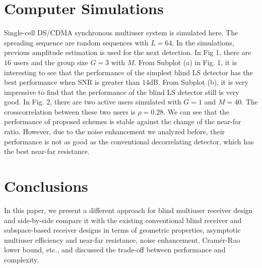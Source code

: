 \documentclass[a4paper,10pt,fleqn, twocolumn]{IEEETran}
\begin{document}
\section{Computer Simulations}
\begin{figure} \label{BER}
\end{figure}
Single-cell DS/CDMA synchronous multiuser system is simulated
here. The spreading sequence are random sequences with $L=64$. In
the simulations, previous amplitude estimation is used for the
next detection. In Fig 1, there are $16$ users and the group size
$G=3$ with $M$. From Subplot (a) in Fig. 1, it is interesting to
see that the performance of the simplest blind LS detector has the
best performance when SNR is greater than $14$dB. From Subplot
(b), it is very impressive to find that the performance of the
blind LS detector still is very good. In Fig. 2, there are two
active users simulated with $G=1$ and $M=40$. The crosscorrelation
between these two users is $\rho=0.28$. We can see that the
performance of proposed schemes is stable against the change of
the near-far ratio. However, due to the noise enhancement we
analyzed before, their performance is not as good as the
conventional decorrelating detector, which has the best near-far
resistance.
\begin{figure} \label{NFR}
\end{figure}
\section{Conclusions}
In this paper, we present a different approach for blind multiuser
receiver design and side-by-side compare it with the existing
conventional blind receiver and subspace-based receiver designs in
terms of geometric properties, asymptotic multiuser efficiency and
near-far resistance, noise enhancement, Cram\'{e}r-Rao lower
bound, etc., and discussed the trade-off between performance and
complexity.
\small


\end{document}
